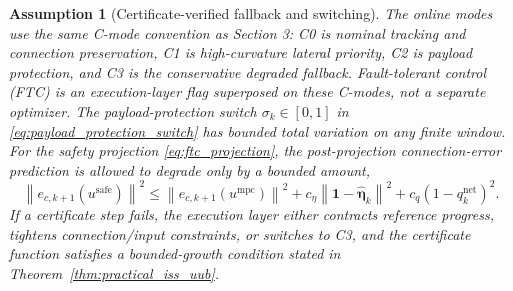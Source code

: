 \documentclass[twocolumn,3p,times,procedia]{elsarticle}
\newcommand{\norm}[1]{\left\lVert #1 \right\rVert}
\newtheorem{assumption}{Assumption}
\begin{document}
\begin{assumption}[Certificate-verified fallback and switching]
The online modes use the same C-mode convention as Section 3: C0 is nominal tracking and connection preservation, C1 is high-curvature lateral priority, C2 is payload protection, and C3 is the conservative degraded fallback. Fault-tolerant control (FTC) is an execution-layer flag superposed on these C-modes, not a separate optimizer. The payload-protection switch $\sigma_k\in[0,1]$ in \eqref{eq:payload_protection_switch} has bounded total variation on any finite window. For the safety projection \eqref{eq:ftc_projection}, the post-projection connection-error prediction is allowed to degrade only by a bounded amount,
\begin{equation}
\norm{e_{c,k+1}(u^{\mathrm{safe}})}^2
\le \norm{e_{c,k+1}(u^{\mathrm{mpc}})}^2
+c_\eta\norm{\mathbf 1-\hat{\boldsymbol\eta}_k}^2
+c_q(1-q_k^{\mathrm{net}})^2 .
\label{eq:ftc_bounded_degradation}
\end{equation}
If a certificate step fails, the execution layer either contracts reference progress, tightens connection/input constraints, or switches to C3, and the certificate function satisfies a bounded-growth condition stated in Theorem~\ref{thm:practical_iss_uub}.
\end{assumption}
\end{document}
